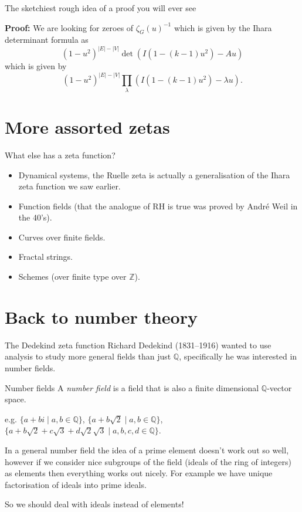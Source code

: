 \documentclass{beamer}
\begin{document}
\begin{frame}{The sketchiest rough idea of a proof you will ever see}

{\bf Proof:}
We are looking for zeroes of $\zeta_G(u)^{-1}$ which is given by the Ihara determinant formula as
\[(1-u^2)^{|E| - |V|}\det(I(1-(k-1)u^2) - Au)\]
which is given by
\[(1-u^2)^{|E| - |V|}\prod_{\lambda}(I(1-(k-1)u^2) - \lambda u).\]

\end{frame}

\section[More zetas]{More assorted zetas}

\begin{frame}{What else has a zeta function?}
\begin{itemize}
\pause\item Dynamical systems, the Ruelle zeta is actually a generalisation of the Ihara zeta function we saw earlier.
\pause\item Function fields (that the analogue of RH is true was proved by Andr\'e Weil in the 40's).
\pause\item Curves over finite fields.
\pause\item Fractal strings.
\pause\item Schemes (over finite type over $\mathbb{Z}$).
\end{itemize}
\end{frame}

\section[Number theory again]{Back to number theory}
\begin{frame}{The Dedekind zeta function}
Richard Dedekind (1831--1916) wanted to use analysis to study more general fields than just $\mathbb{Q}$, specifically he was interested in number fields.

\pause \begin{block}{Number fields}
A \emph{number field} is a field that is also a finite dimensional $\mathbb{Q}$-vector space.
\end{block}

\pause e.g. $\{a+bi\mid a,b\in\mathbb{Q}\}$, \pause $\{a+b\sqrt{2}\mid a,b\in\mathbb{Q}\}$, \pause $\{a+b\sqrt{2} +c\sqrt{3}+d\sqrt{2}\sqrt{3}\mid a,b,c,d\in\mathbb{Q}\}$.

\pause In a general number field the idea of a prime element doesn't work out so well, however if we consider nice subgroups of the field (ideals of the ring of integers) as elements then everything works out nicely.
\pause For example we have unique factorisation of ideals into prime ideals.

\pause So we should deal with ideals instead of elements!
\end{frame}
\end{document}
